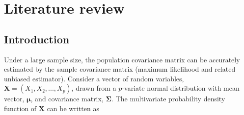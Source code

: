 
\chapter{Literature review}

\newcommand\norm[1]{\left\lVert#1\right\rVert}
\newcommand{\argmax}{\arg\!\max}


\ifpdf
    \graphicspath{{Chapter2/Figs/Raster/}{Chapter2/Figs/PDF/}{Chapter2/Figs/}}
\else
    \graphicspath{{Chapter2/Figs/Vector/}{Chapter2/Figs/}}
\fi


\section{Introduction}

Under a large sample size, the population covariance matrix can be accurately estimated by the sample covariance matrix (maximum likelihood and related unbiased estimator). Consider a vector of random variables, $\textbf{X} = (X_1,X_2, ... ,X_p)$, drawn from a $p$-variate normal distribution with mean vector, $\boldsymbol{\mu}$, and covariance matrix, $\boldsymbol{\Sigma}$. The multivariate probability density function of $\textbf{X}$ can be written as

